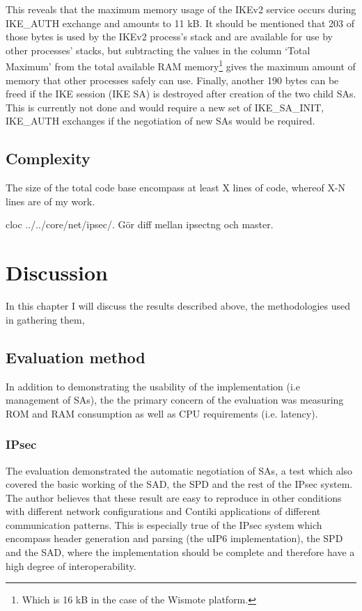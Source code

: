 \documentclass[final,a4paper,twoside,11pt,onecolumn]{report}
\begin{document}
This reveals that the maximum memory usage of the IKEv2 service occurs during IKE\_AUTH exchange and amounts to 11 kB. It should be mentioned that 203 of those bytes is used by the IKEv2 process's stack and are available for use by other processes' stacks, but subtracting the values in the column `Total Maximum' from the total available RAM memory\footnote{Which is 16 kB in the case of the Wismote platform.} gives the maximum amount of memory that other processes safely can use. Finally, another 190 bytes can be freed if the IKE session (IKE SA) is destroyed after creation of the two child SAs. This is currently not done and would require a new set of IKE\_SA\_INIT, IKE\_AUTH exchanges if the negotiation of new SAs would be required.  


\section{Complexity}
The size of the total code base encompass at least X lines of code, whereof X-N lines are of my work.

cloc ../../core/net/ipsec/. Gör diff mellan ipsectng och master.

\chapter{Discussion}
In this chapter I will discuss the results described above, the methodologies used in gathering them, 

\section{Evaluation method}
In addition to demonstrating the usability of the implementation (i.e management of SAs), the the primary concern of the evaluation was measuring ROM and RAM consumption as well as CPU requirements (i.e. latency).

\subsection{IPsec}
The evaluation demonstrated the automatic negotiation of SAs, a test which also covered the basic working of the SAD, the SPD and the rest of the IPsec system. The author believes that these result are easy to reproduce in other conditions with different network configurations and Contiki applications of different communication patterns. This is especially true of the IPsec system which encompass header generation and parsing (the uIP6 implementation), the SPD and the SAD, where the implementation should be complete and therefore have a high degree of interoperability.
\end{document}
